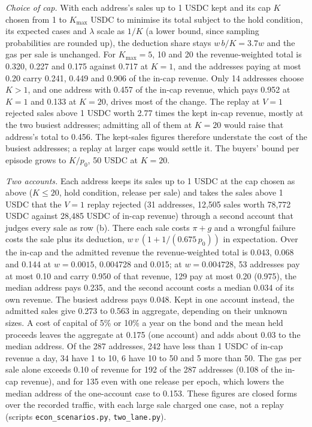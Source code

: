 \documentclass[10pt,a4paper]{article}
\theoremstyle{plain}
\theoremstyle{remark}
\begin{document}
\emph{Choice of cap.} With each address's sales up to 1 USDC kept and its cap $K$ chosen from 1 to $K_{\max}$ USDC to minimise its total subject to the hold condition, its expected cases and $\lambda$ scale as $1/K$ (a lower bound, since sampling probabilities are rounded up), the deduction share stays $w\,b/K=3.7w$ and the gas per sale is unchanged. For $K_{\max}=5$, 10 and 20 the revenue-weighted total is 0.320, 0.227 and 0.175 against 0.717 at $K=1$, and the addresses paying at most 0.20 carry 0.241, 0.449 and 0.906 of the in-cap revenue. Only 14 addresses choose $K>1$, and one address with 0.457 of the in-cap revenue, which pays 0.952 at $K=1$ and 0.133 at $K=20$, drives most of the change. The replay at $V=1$ rejected sales above 1 USDC worth 2.77 times the kept in-cap revenue, mostly at the two busiest addresses; admitting all of them at $K=20$ would raise that address's total to 0.456. The kept-sales figures therefore understate the cost of the busiest addresses; a replay at larger caps would settle it. The buyers' bound per episode grows to $K/p_0$, 50 USDC at $K=20$.

\emph{Two accounts.} Each address keeps its sales up to 1 USDC at the cap chosen as above ($K\le20$, hold condition, release per sale) and takes the sales above 1 USDC that the $V=1$ replay rejected (31 addresses, 12,505 sales worth 78,772 USDC against 28,485 USDC of in-cap revenue) through a second account that judges every sale as row (b). There each sale costs $\pi+g$ and a wrongful failure costs the sale plus its deduction, $w\,v\,(1+1/(0.675\,p_0))$ in expectation. Over the in-cap and the admitted revenue the revenue-weighted total is 0.043, 0.068 and 0.144 at $w=0.0015$, 0.004728 and 0.015; at $w=0.004728$, 53 addresses pay at most 0.10 and carry 0.950 of that revenue, 129 pay at most 0.20 (0.975), the median address pays 0.235, and the second account costs a median 0.034 of its own revenue. The busiest address pays 0.048. Kept in one account instead, the admitted sales give 0.273 to 0.563 in aggregate, depending on their unknown sizes. A cost of capital of 5\% or 10\% a year on the bond and the mean held proceeds leaves the aggregate at 0.175 (one account) and adds about 0.03 to the median address. Of the 287 addresses, 242 have less than 1 USDC of in-cap revenue a day, 34 have 1 to 10, 6 have 10 to 50 and 5 more than 50. The gas per sale alone exceeds 0.10 of revenue for 192 of the 287 addresses (0.108 of the in-cap revenue), and for 135 even with one release per epoch, which lowers the median address of the one-account case to 0.153. These figures are closed forms over the recorded traffic, with each large sale charged one case, not a replay (scripts \texttt{econ\_scenarios.py}, \texttt{two\_lane.py}).
\end{document}
